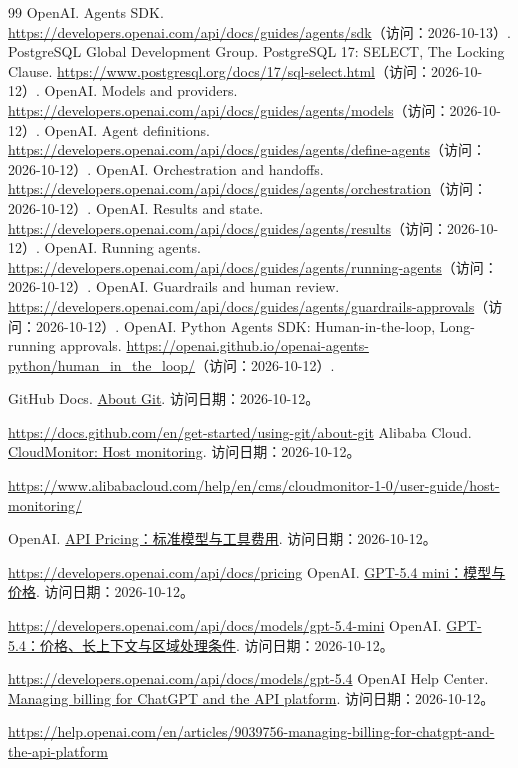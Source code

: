 \documentclass[11pt,a4paper]{article}
\begin{document}
\begin{thebibliography}{99}
 OpenAI. Agents SDK. \url{https://developers.openai.com/api/docs/guides/agents/sdk}（访问：2026-10-13）.
 PostgreSQL Global Development Group. PostgreSQL 17: SELECT, The Locking Clause. \url{https://www.postgresql.org/docs/17/sql-select.html}（访问：2026-10-12）.
 OpenAI. Models and providers. \url{https://developers.openai.com/api/docs/guides/agents/models}（访问：2026-10-12）.
 OpenAI. Agent definitions. \url{https://developers.openai.com/api/docs/guides/agents/define-agents}（访问：2026-10-12）.
 OpenAI. Orchestration and handoffs. \url{https://developers.openai.com/api/docs/guides/agents/orchestration}（访问：2026-10-12）.
 OpenAI. Results and state. \url{https://developers.openai.com/api/docs/guides/agents/results}（访问：2026-10-12）.
 OpenAI. Running agents. \url{https://developers.openai.com/api/docs/guides/agents/running-agents}（访问：2026-10-12）.
 OpenAI. Guardrails and human review. \url{https://developers.openai.com/api/docs/guides/agents/guardrails-approvals}（访问：2026-10-12）.
 OpenAI. Python Agents SDK: Human-in-the-loop, Long-running approvals. \url{https://openai.github.io/openai-agents-python/human_in_the_loop/}（访问：2026-10-12）.

 GitHub Docs. \href{https://docs.github.com/en/get-started/using-git/about-git}{About Git}. 访问日期：2026-10-12。\par\url{https://docs.github.com/en/get-started/using-git/about-git}
 Alibaba Cloud. \href{https://www.alibabacloud.com/help/en/cms/cloudmonitor-1-0/user-guide/host-monitoring/}{CloudMonitor: Host monitoring}. 访问日期：2026-10-12。\par\url{https://www.alibabacloud.com/help/en/cms/cloudmonitor-1-0/user-guide/host-monitoring/}

 OpenAI. \href{https://developers.openai.com/api/docs/pricing}{API Pricing：标准模型与工具费用}. 访问日期：2026-10-12。\par\url{https://developers.openai.com/api/docs/pricing}
 OpenAI. \href{https://developers.openai.com/api/docs/models/gpt-5.4-mini}{GPT-5.4 mini：模型与价格}. 访问日期：2026-10-12。\par\url{https://developers.openai.com/api/docs/models/gpt-5.4-mini}
 OpenAI. \href{https://developers.openai.com/api/docs/models/gpt-5.4}{GPT-5.4：价格、长上下文与区域处理条件}. 访问日期：2026-10-12。\par\url{https://developers.openai.com/api/docs/models/gpt-5.4}
 OpenAI Help Center. \href{https://help.openai.com/en/articles/9039756-managing-billing-for-chatgpt-and-the-api-platform}{Managing billing for ChatGPT and the API platform}. 访问日期：2026-10-12。\par{\def\UrlBreaks{\do\/\do-\do.}\url{https://help.openai.com/en/articles/9039756-managing-billing-for-chatgpt-and-the-api-platform}}


\end{thebibliography}
\end{document}
